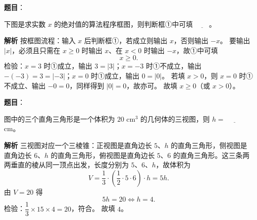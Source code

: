 \begin{answer}

\textbf{题目}：

下图是求实数 $x$ 的绝对值的算法程序框图，则判断框①中可填 $\underline{\qquad}$。
\nopagebreak[4]
\begin{center}\end{center}
\nopagebreak[4]
\textbf{解析}
按框图流程：输入 $x$ 后判断框①，若成立则输出 $x$，否则输出 $-x$。
要输出 $|x|$，必须且只需在 $x\geqslant0$ 时输出 $x$、在 $x<0$ 时输出 $-x$，故①中可填
\nopagebreak[4]
\[x\geqslant0.\]
检验：$x=3$ 时①成立，输出 $3=|3|$；$x=-3$ 时①不成立，输出 $-(-3)=3=|-3|$；$x=0$ 时①成立，输出 $0=|0|$。
若填 $x>0$，则 $x=0$ 时①不成立、输出 $-0=0$，同样得到 $|0|=0$，故亦可。
故填 $x\geqslant0$（或 $x>0$）。


\end{answer}
\begin{answer}

\textbf{题目}：

图中的三个直角三角形是一个体积为 $20$ cm$^3$ 的几何体的三视图，则 $h=$ $\underline{\qquad}$ cm。
\nopagebreak[4]
\begin{center}\end{center}
\nopagebreak[4]
\textbf{解析}
三视图对应一个三棱锥：正视图是直角边长 $5$、$h$ 的直角三角形，侧视图是直角边长 $6$、$h$ 的直角三角形，俯视图是直角边长 $5$、$6$ 的直角三角形。这三条两两垂直的棱从同一顶点出发，长度分别为 $5$、$6$、$h$，故体积为
\nopagebreak[4]
\[V=\frac13\cdot\left(\frac12\cdot5\cdot6\right)\cdot h=5h.\]
由 $V=20$ 得
\nopagebreak[4]
\[5h=20\iff h=4.\]
检验：$\dfrac13\times15\times4=20$，符合。
故填 $4$。


\end{answer}
